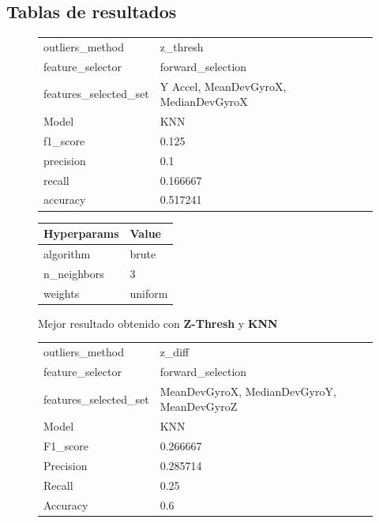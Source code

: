 \begin{appendices}
	\newpage
	\section*{Tablas de resultados}
		\begin{figure}[htb]
			\centering
			\begin{tabular}{ll}
				\toprule
					  outliers\_method &                                z\_thresh \\
					 feature\_selector &                       forward\_selection \\
				features\_selected\_set & {Y Accel, MeanDevGyroX, MedianDevGyroX} \\
								Model &                                     KNN \\
						f1\_score &                                   0.125 \\
					   precision &                                     0.1 \\
						  recall &                                0.166667 \\
						accuracy &                                0.517241 \\
				\bottomrule
			\end{tabular}
			\newline
			\newline

			\begin{tabular}{ll}
				\toprule
				Hyperparams &   Value \\
				\midrule
				  algorithm &   brute \\
				n\_neighbors &       3 \\
					weights & uniform \\
				\bottomrule
			\end{tabular}
			\caption{Mejor resultado obtenido con \textbf{Z-Thresh} y \textbf{KNN}}
			\label{table:17}
		\end{figure}

		\begin{figure}[htb]
			\centering
			\begin{tabular}{ll}
				\toprule
					  outliers\_method &                                       z\_diff \\
					 feature\_selector &                            forward\_selection \\
				features\_selected\_set & {MeanDevGyroX, MedianDevGyroY, MeanDevGyroZ} \\
								Model &                                          KNN \\
						F1\_score &                                     0.266667 \\
					   Precision &                                     0.285714 \\
						  Recall &                                         0.25 \\
						Accuracy &                                          0.6 \\
				\bottomrule
			\end{tabular}
			\newline
			\newline


\end{figure}
\end{appendices}
